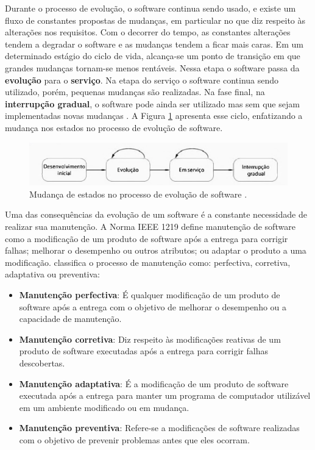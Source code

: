 Durante o processo de evolução, o software continua sendo usado, e existe um fluxo de constantes propostas de mudanças, em particular no que diz respeito às alterações nos requisitos. Com o decorrer do tempo, as constantes alterações tendem a degradar o software e as mudanças tendem a ficar mais caras. Em um determinado estágio do ciclo de vida, alcança-se um ponto de transição em que grandes mudanças tornam-se menos rentáveis. Nessa etapa o software passa da \textbf{evolução} para o \textbf{serviço}. Na etapa do serviço o software continua sendo utilizado, porém, pequenas mudanças são realizadas. Na fase final, na \textbf{interrupção gradual}, o software pode ainda ser utilizado mas sem que sejam implementadas novas mudanças \cite{sommerville2011engenharia}. A Figura \ref{figure:evolucaoeservico} apresenta esse ciclo, enfatizando a mudança nos estados no processo de evolução de software.

\begin{figure}[!htb]
\centering
\includegraphics[width=.75\textwidth]{images/evolucaoeservico.png}
\caption{Mudança de estados no processo de evolução de software \cite{sommerville2011engenharia}.}
\label{figure:evolucaoeservico}
\end{figure}

Uma das consequências da evolução de um software é a constante necessidade de realizar sua manutenção. A Norma IEEE 1219 \cite{257623} define manutenção de software como a modificação de um produto de software após a entrega para corrigir falhas; melhorar o desempenho ou outros atributos; ou adaptar o produto a uma modificação.  classifica o processo de manutenção como: perfectiva, corretiva, adaptativa ou preventiva:

\begin{itemize}
   
    \item \textbf{Manutenção perfectiva}: É qualquer modificação de um produto de software após a entrega com o objetivo de melhorar o desempenho ou a capacidade de manutenção.
   
    \item \textbf{Manutenção corretiva}: Diz respeito às modificações reativas de um produto de software executadas após a entrega para corrigir falhas descobertas.
   
    \item \textbf{Manutenção adaptativa}: É a modificação de um produto de software executada após a entrega para manter um programa de computador utilizável em um ambiente modificado ou em mudança.
   
    \item \textbf{Manutenção preventiva}: Refere-se a modificações de software realizadas com o objetivo de prevenir problemas antes que eles ocorram.

\end{itemize}

